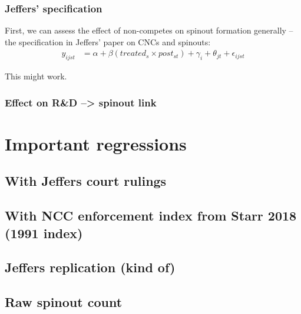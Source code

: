 \documentclass[12pt,english]{article}
\theoremstyle{remark}
\begin{document}
\subsubsection{Jeffers' specification}

First, we can assess the effect of non-competes on spinout formation generally -- the specification in Jeffers' paper on CNCs and spinouts: 
\begin{align*}
	y_{ijst} &= \alpha + \beta(treated_s \times post_{st}) + \gamma_i + \theta_{jt} + \epsilon_{ijst} 
\end{align*}

This might work. 

\subsubsection{Effect on R\&D --> spinout link}


\section{Important regressions}



\subsection{With Jeffers court rulings}



\subsection{With NCC enforcement index from Starr 2018 (1991 index)}



\subsection{Jeffers replication (kind of)}



\subsection{Raw spinout count}


\linebreak
\end{document}
